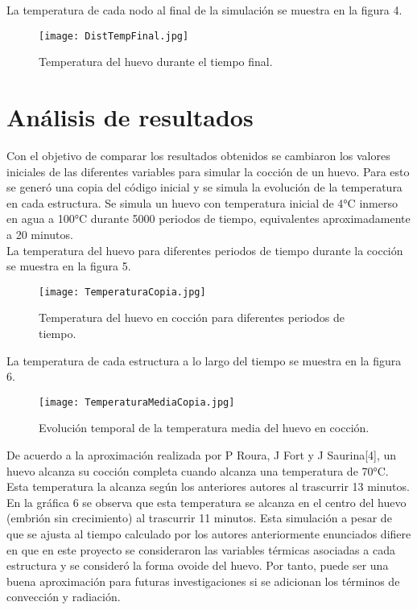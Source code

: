 \documentclass{article}
\begin{document}
	La temperatura de cada nodo al final de la simulación se muestra en la figura 4.
	
	\begin{figure}
	\centering
	\texttt{[image: DistTempFinal.jpg]}
	\caption{Temperatura del huevo durante el tiempo final.}
	\end{figure}
	
	\section{Análisis de resultados}
	
	Con el objetivo de comparar los resultados obtenidos se cambiaron los valores iniciales de las diferentes variables para simular la cocción de un huevo. Para esto se generó una copia del código inicial y se simula la evolución de la temperatura en cada estructura. Se simula un huevo con temperatura inicial de 4°C inmerso en agua a 100°C durante 5000 periodos de tiempo, equivalentes aproximadamente a 20 minutos.\\
	
	La temperatura del huevo para diferentes periodos de tiempo durante la cocción se muestra en la figura 5. \\
	
	\begin{figure}
		\centering
		\texttt{[image: TemperaturaCopia.jpg]}
		\caption{Temperatura del huevo en cocción para diferentes periodos de tiempo.}
	\end{figure}
	
	La temperatura de cada estructura a lo largo del tiempo se muestra en la figura 6.\\
	
		\begin{figure}[h]
		\centering
		\texttt{[image: TemperaturaMediaCopia.jpg]}
		\caption{Evolución temporal de la temperatura media del huevo en cocción.}
	\end{figure}
		
	De acuerdo a la aproximación realizada por P Roura, J Fort y J Saurina[4], un huevo alcanza su cocción completa cuando alcanza una temperatura de 70°C. Esta temperatura la alcanza según los anteriores autores al trascurrir 13 minutos. En la gráfica 6 se observa que esta temperatura se alcanza en el centro del huevo (embrión sin crecimiento) al trascurrir 11 minutos. Esta simulación a pesar de que se ajusta al tiempo calculado por los autores anteriormente enunciados difiere en que en este proyecto se consideraron las variables térmicas asociadas a cada estructura y se consideró la forma ovoide del huevo. Por tanto, puede ser una buena aproximación para futuras investigaciones si se adicionan los términos de convección y radiación.\\
	
\end{document}
